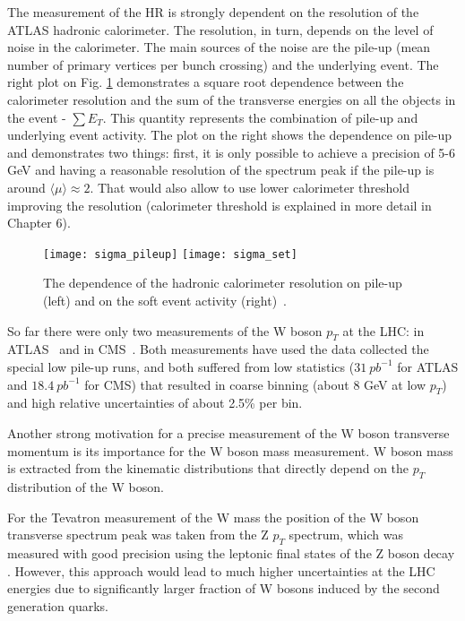 The measurement of the HR is strongly dependent on the resolution of the ATLAS hadronic calorimeter. The resolution, in turn, depends on the level of noise in the calorimeter. The main sources of the noise are the pile-up (mean number of primary vertices per bunch crossing) and the underlying event. The right plot on Fig. \ref{fig:sigma_set} demonstrates a square root dependence between the calorimeter resolution and the sum of the transverse energies on all the objects in the event - $\sum E_T$. This quantity represents the combination of pile-up and underlying event activity. The plot on the right shows the dependence on pile-up and demonstrates two things: first, it is only possible to achieve a precision of 5-6 GeV and having a reasonable resolution of the spectrum peak if the pile-up is around $\langle \mu \rangle \approx 2$. That would also allow to use lower calorimeter threshold improving the resolution (calorimeter threshold is explained in more detail in Chapter 6).

	\begin{figure}[tph]
	\centering
	\texttt{[image: sigma\_pileup]}%
	\texttt{[image: sigma\_set]}
	\caption{The dependence of the hadronic calorimeter resolution on pile-up (left) and on the soft event activity (right)~\cite{wpt_prospects}.}
	\label{fig:sigma_set}
	\end{figure} 

So far there were only two measurements of the W boson $p_T$ at the LHC: in ATLAS~\cite{wpt_atlas} and in CMS~\cite{wpt_cms}. Both measurements have used the data collected the special low pile-up runs, and both suffered from low statistics ($31~pb^{-1}$ for ATLAS and $18.4~pb^{-1}$ for CMS) that resulted in coarse binning (about 8 GeV at low $p_T$) and high relative uncertainties of about 2.5\% per bin.

Another strong motivation for a precise measurement of the W boson transverse momentum is its importance for the W boson mass measurement. W boson mass is extracted from the kinematic distributions that directly depend on the $p_T$ distribution of the W boson. 

For the Tevatron measurement of the W mass the position of the W boson transverse spectrum peak was taken from the Z $p_T$ spectrum, which was measured with good precision using the leptonic final states of the Z boson decay \cite{wmass_cdf}. However, this approach would lead to much higher uncertainties at the LHC energies due to significantly larger fraction of W bosons induced by the second generation quarks. 

